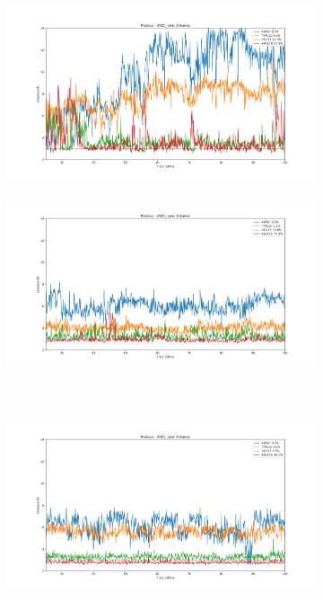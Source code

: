 \documentclass[fleqn,10pt]{wlscirep}
\begin{document}
\begin{figure}[!ht]
\centering
  \begin{subfigure}{.45\textwidth}
     \centering
     \includegraphics[width=.95\linewidth]{2AZC_canc/2AZC_canc-dist_0.pdf}
  \end{subfigure}
  \begin{subfigure}{.45\textwidth}
     \centering
     \includegraphics[width=.95\linewidth]{2AZC_canc/2AZC_canc-dist_1.pdf}
  \end{subfigure}
  \\
  \begin{subfigure}{.45\textwidth}
     \centering
     \includegraphics[width=.95\linewidth]{2AZC_canc/2AZC_canc-dist_2.pdf}

\end{subfigure}
\end{figure}
\end{document}
